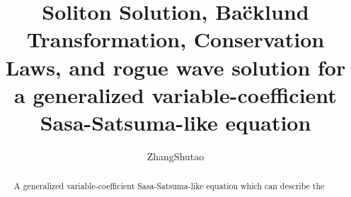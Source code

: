 \documentclass[12pt]{article}
\title{\large\bfseries Soliton Solution, Ba\"cklund Transformation, Conservation Laws, and rogue wave solution for a generalized variable-coefficient Sasa-Satsuma-like equation}
\author{ZhangShutao}
\begin{document}
\maketitle

\begin{abstract}
A generalized variable-coefficient Sasa-Satsuma-like equation which can describe the 
\end{abstract}
\end{document}
